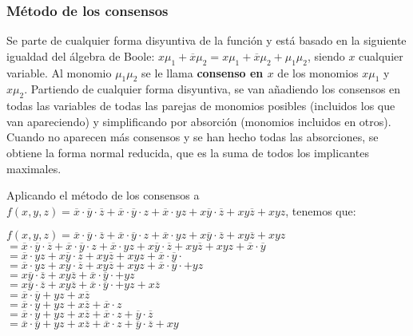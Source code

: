 \subsubsection{Método de los consensos}
Se parte de cualquier forma disyuntiva de la función y está basado en la siguiente igualdad del álgebra de Boole: $x\mu_1 + \overline{x}\mu_2 = x\mu_1 + \overline{x}\mu_2 + \mu_1\mu_2$, siendo $x$ cualquier variable.
Al monomio $\mu_1\mu_2$ se le llama \textbf{consenso en $x$} de los monomios $x\mu_1$ y $x\mu_2$. \smallskip
Partiendo de cualquier forma disyuntiva, se van añadiendo los consensos en todas las variables de todas las parejas de monomios posibles (incluidos los que van apareciendo) y simplificando por absorción (monomios incluidos en otros).
Cuando no aparecen más consensos y se han hecho todas las absorciones, se obtiene la forma normal reducida, que es la suma de todos los implicantes maximales.
\begin{ejemplo}
    Aplicando el método de los consensos a $f(x,y,z) =\overline{x} \cdot \overline{y} \cdot \overline{z}+\overline{x} \cdot \overline{y} \cdot z+\overline{x} \cdot yz+x\overline{y} \cdot \overline{z}+xy\overline{z}+xyz$, tenemos que: \smallskip
    \begin{center}
        $f(x,y,z) =\overline{x} \cdot \overline{y} \cdot \overline{z}+\overline{x} \cdot \overline{y} \cdot z+\overline{x} \cdot yz+x\overline{y} \cdot \overline{z}+xy\overline{z}+xyz$ \\
        $= \overline{x} \cdot \overline{y} \cdot \overline{z}+\overline{x} \cdot \overline{y} \cdot z+\overline{x} \cdot yz+x\overline{y} \cdot \overline{z}+xy\overline{z}+xyz+\overline{x} \cdot \overline{y}$ \\
        $=\overline{x} \cdot yz+x\overline{y} \cdot \overline{z}+xy\overline{z}+xyz+\overline{x} \cdot \overline{y} \cdot $ \\
        $=\overline{x} \cdot yz+x\overline{y} \cdot \overline{z}+xy\overline{z}+xyz+\overline{x} \cdot \overline{y} \cdot +yz$ \\
        $= x\overline{y} \cdot \overline{z}+xy\overline{z}+\overline{x} \cdot \overline{y} \cdot +yz$ \\
        $=x\overline{y} \cdot \overline{z}+xy\overline{z}+\overline{x} \cdot \overline{y} \cdot +yz+x\overline{z}$ \\
        $=\overline{x} \cdot \overline{y} +yz+x\overline{z}$ \\
        $=\overline{x} \cdot \overline{y} +yz+x\overline{z}+\overline{x} \cdot z$ \\
        $=\overline{x} \cdot \overline{y} +yz+x\overline{z}+\overline{x} \cdot z+\overline{y} \cdot \overline{z}$ \\
        $=\overline{x} \cdot \overline{y} +yz+x\overline{z}+\overline{x} \cdot z+\overline{y} \cdot \overline{z}+xy$
    \end{center}
\end{ejemplo}

